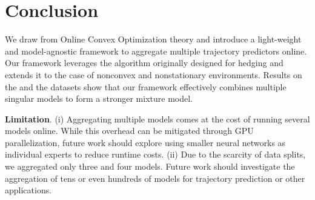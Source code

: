\section{Conclusion}
\label{sec:conclusion}

We draw from Online Convex Optimization theory and introduce a light-weight and model-agnostic framework to aggregate multiple trajectory predictors online. Our framework leverages the \squint algorithm originally designed for hedging and extends it to the case of nonconvex and nonstationary environments. Results on the \nuscenes and the \lyft datasets show that our framework effectively combines multiple singular models to form a stronger mixture model.

{\bf Limitation}.
(i) Aggregating multiple models comes at the cost of running several models online. While this overhead can be mitigated through GPU parallelization, future work should explore using smaller neural networks as individual experts to reduce runtime costs. (ii) Due to the scarcity of data splits, we aggregated only three and four models. Future work should investigate the aggregation of tens or even hundreds of models for trajectory prediction or other applications.

